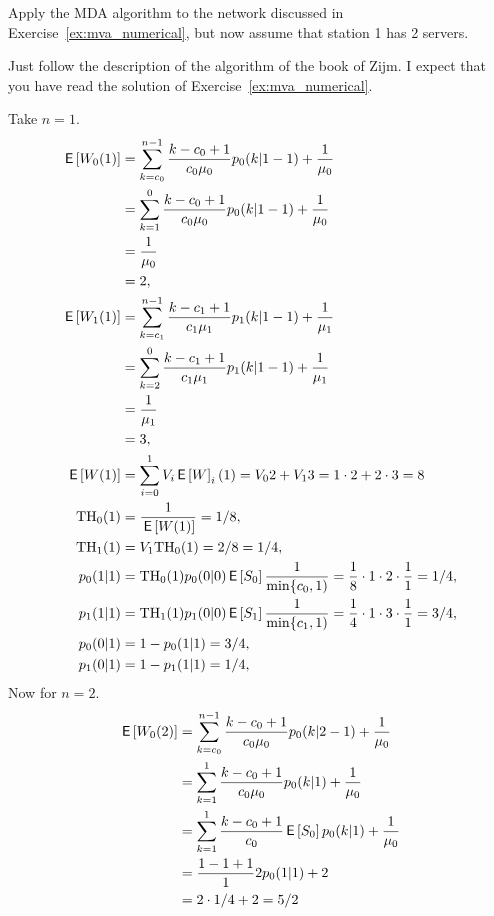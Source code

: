 \begin{exercise}
  Apply the MDA algorithm to the network discussed in Exercise~\ref{ex:mva_numerical}, but now assume that station 1 has 2 servers. 
  \begin{hint}
 Just follow the description of the algorithm of the book of
    Zijm. I expect that you have read the solution of
    Exercise~\ref{ex:mva_numerical}.
  \end{hint}
  \begin{solution}
    Take $n=1$.
    \begin{align*}
      \,\mathsf{E}\left[W_0(1)\right] 
&= \sum_{k=c_0}^{n-1} \frac{k-c_0+1}{c_0 \mu_0} p_0(k|1-1) + \frac1{\mu_0} \\
&= \sum_{k=1}^{0} \frac{k-c_0+1}{c_0 \mu_0} p_0(k|1-1) + \frac1{\mu_0} \\
&= \frac1{\mu_0} \\
&= 2, \\
      \,\mathsf{E}\left[W_1(1)\right]
&= \sum_{k=c_1}^{n-1} \frac{k-c_1+1}{c_1 \mu_1} p_1(k|1-1) + \frac1{\mu_1} \\
&= \sum_{k=2}^{0} \frac{k-c_1+1}{c_1 \mu_1} p_1(k|1-1) + \frac1{\mu_1} \\
&= \frac1{\mu_1} \\
&= 3, \\
\,\mathsf{E}\left[W(1)\right] &= \sum_{i=0}^1 V_i \,\mathsf{E}\left[W\right]_i(1) = V_0 2 + V_1  3 = 1\cdot 2 + 2 \cdot 3 = 8\\
\mathrm{TH}_0(1) &= \frac{1}{\,\mathsf{E}\left[W(1)\right]} = 1/8, \\
\mathrm{TH}_1(1) &= V_1 \mathrm{TH}_0(1) = 2/8=1/4, \\
p_0(1|1) 
&= \mathrm{TH}_0(1)p_0(0|0)\,\mathsf{E}\left[S_0\right] \frac1{\min\{c_0,1)} = \frac18\cdot 1\cdot 2 \cdot \frac{1}{1}=1/4, \\ 
p_1(1|1) 
&= \mathrm{TH}_1(1)p_1(0|0)\,\mathsf{E}\left[S_1\right] \frac1{\min\{c_1,1)} = \frac14\cdot 1\cdot 3 \cdot \frac{1}{1}=3/4, \\
p_0(0|1) &= 1-p_0(1|1) = 3/4, \\
p_1(0|1) &= 1-p_1(1|1) = 1/4, \\
    \end{align*}
Now for $n=2$.
    \begin{align*}
      \E{W_0(2)}
&= \sum_{k=c_0}^{n-1} \frac{k-c_0+1}{c_0 \mu_0} p_0(k|2-1) + \frac1{\mu_0} \\
&= \sum_{k=1}^{1} \frac{k-c_0+1}{c_0 \mu_0} p_0(k|1) + \frac1{\mu_0} \\
&= \sum_{k=1}^{1} \frac{k-c_0+1}{c_0 }\E{S_0} p_0(k|1) + \frac1{\mu_0} \\
&=  \frac{1-1+1}{1 }2 p_0(1|1) + 2 \\
&=  2\cdot 1/4 + 2 =5/2\\

\end{align*}
\end{solution}
\end{exercise}
